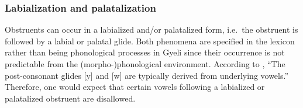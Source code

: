 






\subsubsection{Labialization and palatalization}
\label{sec:Labial}

Obstruents can occur in a labialized and/or palatalized form, i.e.\ the obstruent is followed by a labial or palatal glide. Both phenomena are specified in the lexicon rather than being phonological processes in Gyeli since their occurrence is not predictable from the (morpho-)phonological environment. According to \citet[55]{hyman2003}, ``The post-consonant glides [y] and [w] are typically derived from underlying vowels.'' Therefore, one would expect that certain vowels following a labialized or palatalized obstruent are disallowed.
 
